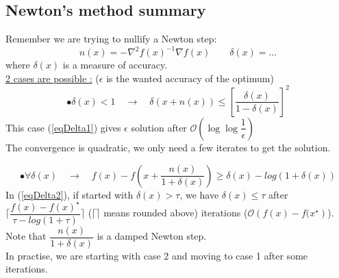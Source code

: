 \subsection{Newton's method summary}
Remember we are trying to nullify a Newton step:
$$n(x) = - \nabla^2 f(x)^{-1} \nabla f(x) \qquad \delta (x) = \dots $$
where $\delta (x)$ is a measure of accuracy.\\
\underline{2 cases are possible :} ($\epsilon$ is the wanted accuracy of the optimum)
\begin{equation}
\label{eqDelta1}
 \bullet\delta (x) < 1 \quad \rightarrow \quad \delta (x + n(x)) \leq \left[ \dfrac{\delta (x)}{1 - \delta (x)} \right]^2 
\end{equation}
This case (\ref{eqDelta1}) gives $\epsilon$ solution after $\mathcal{O} (\log \log \dfrac{1}{\epsilon})$\\
The convergence is quadratic, we only need a few iterates to get the solution.

\begin{equation}
\label{eqDelta2}
\bullet\forall \delta(x) \quad \rightarrow \quad f(x) - f\left(x + \dfrac{n(x)}{1 + \delta(x)}\right) \geq \delta(x) - log(1 + \delta(x))
\end{equation}
In (\ref{eqDelta2}), if started with $\delta(x) > \tau $, we have $\delta(x) \leq \tau$ after $\lceil\dfrac{f(x) - f(x)^{\star}}{\tau - log(1 + \tau)}\rceil$ ($\lceil \rceil$ means rounded above) iterations ($\mathcal{O}\left(f(x)-f(x^{\star}\right)$). \\
Note that $\dfrac{n(x)}{1 + \delta(x)}$ is a damped Newton step.\\
In practise, we are starting with case 2 and moving to case 1 after some iterations.

